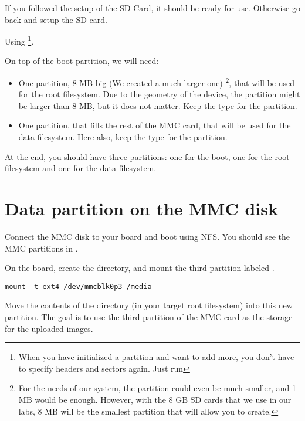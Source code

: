 If you followed the setup of the SD-Card, it should be ready for use.
Otherwise go back and setup the SD-card.

Using 
\footnote{When you have initialized a partition and want to add more, you don't have to specify headers and sectors again. Just run }.

\clearpage
On top of the boot partition, we will need:

\begin{itemize}

\item One partition, 8 MB big (We created a much larger one)
  \footnote{For the needs of our system, the partition could even be
  much smaller, and 1 MB would be enough. However, with the 8 GB SD
  cards that we use in our labs, 8 MB will be the smallest partition
  that  will allow you to create.},
  that will be used for the root filesystem. Due to the geometry of the device,
  the partition might be larger than 8 MB, but it does not matter. 
  Keep the  type for the partition.

\item One partition, that fills the rest of the MMC card, that will be
  used for the data filesystem. Here also, keep the  type
  for the partition.

\end{itemize}

At the end, you should have three partitions: one for the boot, one
for the root filesystem and one for the data filesystem.

\section{Data partition on the MMC disk}

Connect the MMC disk to your board and boot using NFS. 
You should see the MMC partitions in .

On the board, create the  directory, and mount the third partition
labeled .

\begin{verbatim}
mount -t ext4 /dev/mmcblk0p3 /media
\end{verbatim}

Move the contents of the  directory (in your target root filesystem)
into this new partition. The goal is to use the third partition of the
MMC card as the storage for the uploaded images.

